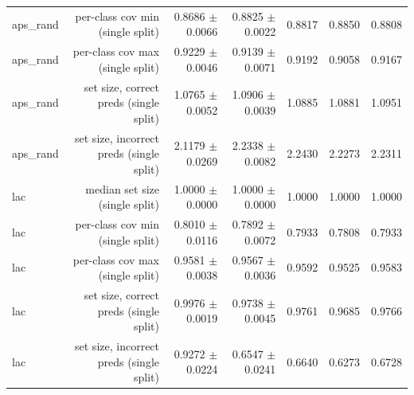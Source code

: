 \begin{table}
\begin{tabular}{lrrrrrr}
         aps\_rand &         per-class cov min (single split) &                         0.8686 $\pm$ 0.0066 &                           0.8825 $\pm$ 0.0022 &     0.8817 &     0.8850 &     0.8808 \\
         aps\_rand &         per-class cov max (single split) &                         0.9229 $\pm$ 0.0046 &                           0.9139 $\pm$ 0.0071 &     0.9192 &     0.9058 &     0.9167 \\
         aps\_rand &   set size, correct preds (single split) &                         1.0765 $\pm$ 0.0052 &                           1.0906 $\pm$ 0.0039 &     1.0885 &     1.0881 &     1.0951 \\
         aps\_rand & set size, incorrect preds (single split) &                         2.1179 $\pm$ 0.0269 &                           2.2338 $\pm$ 0.0082 &     2.2430 &     2.2273 &     2.2311 \\
              lac &           median set size (single split) &                         1.0000 $\pm$ 0.0000 &                           1.0000 $\pm$ 0.0000 &     1.0000 &     1.0000 &     1.0000 \\
              lac &         per-class cov min (single split) &                         0.8010 $\pm$ 0.0116 &                           0.7892 $\pm$ 0.0072 &     0.7933 &     0.7808 &     0.7933 \\
              lac &         per-class cov max (single split) &                         0.9581 $\pm$ 0.0038 &                           0.9567 $\pm$ 0.0036 &     0.9592 &     0.9525 &     0.9583 \\
              lac &   set size, correct preds (single split) &                         0.9976 $\pm$ 0.0019 &                           0.9738 $\pm$ 0.0045 &     0.9761 &     0.9685 &     0.9766 \\
              lac & set size, incorrect preds (single split) &                         0.9272 $\pm$ 0.0224 &                           0.6547 $\pm$ 0.0241 &     0.6640 &     0.6273 &     0.6728 \\
\bottomrule
\end{tabular}
\end{table}
